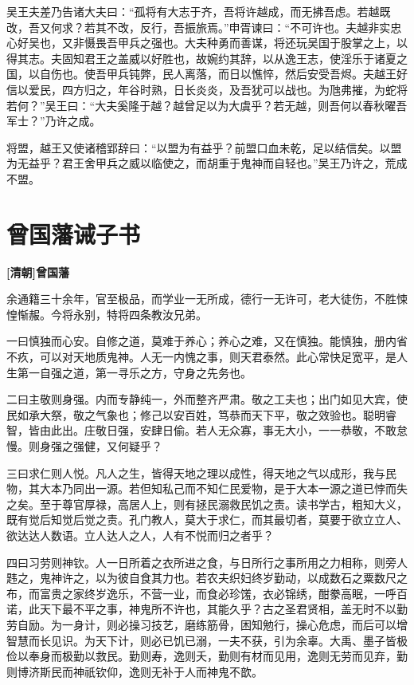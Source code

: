 \documentclass[UTF8,titlepage,oneside]{ctexbook}
\begin{document}
吴王夫差乃告诸大夫曰：“孤将有大志于齐，吾将许越成，而无拂吾虑。若越既改，吾又何求？若其不改，反行，吾振旅焉。”申胥谏曰：“不可许也。夫越非实忠心好吴也，又非慑畏吾甲兵之强也。大夫种勇而善谋，将还玩吴国于股掌之上，以得其志。夫固知君王之盖威以好胜也，故婉约其辞，以从逸王志，使淫乐于诸夏之国，以自伤也。使吾甲兵钝弊，民人离落，而日以憔悴，然后安受吾烬。夫越王好信以爱民，四方归之，年谷时熟，日长炎炎，及吾犹可以战也。为虺弗摧，为蛇将若何？”吴王曰：“大夫奚隆于越？越曾足以为大虞乎？若无越，则吾何以春秋曜吾军士？”乃许之成。


将盟，越王又使诸稽郢辞曰：“以盟为有益乎？前盟口血未乾，足以结信矣。以盟为无益乎？君王舍甲兵之威以临使之，而胡重于鬼神而自轻也。”吴王乃许之，荒成不盟。



\chapter*{曾国藩诫子书}
\begin{center}
	\textbf{[清朝]曾国藩}
\end{center}


余通籍三十余年，官至极品，而学业一无所成，德行一无许可，老大徒伤，不胜悚惶惭赧。今将永别，特将四条教汝兄弟。


一曰慎独而心安。自修之道，莫难于养心；养心之难，又在慎独。能慎独，册内省不疚，可以对天地质鬼神。人无一内愧之事，则天君泰然。此心常快足宽平，是人生第一自强之道，第一寻乐之方，守身之先务也。


二曰主敬则身强。内而专静纯一，外而整齐严肃。敬之工夫也；出门如见大宾，使民如承大祭，敬之气象也；修己以安百姓，笃恭而天下平，敬之效验也。聪明睿智，皆由此出。庄敬日强，安肆日偷。若人无众寡，事无大小，一一恭敬，不敢怠慢。则身强之强健，又何疑乎？


三曰求仁则人悦。凡人之生，皆得天地之理以成性，得天地之气以成形，我与民物，其大本乃同出一源。若但知私己而不知仁民爱物，是于大本一源之道已悖而失之矣。至于尊官厚禄，高居人上，则有拯民溺救民饥之责。读书学古，粗知大义，既有觉后知觉后觉之责。孔门教人，莫大于求仁，而其最切者，莫要于欲立立人、欲达达人数语。立人达人之人，人有不悦而归之者乎？


四曰习劳则神钦。人一日所着之衣所进之食，与日所行之事所用之力相称，则旁人韪之，鬼神许之，以为彼自食其力也。若农夫织妇终岁勤动，以成数石之粟数尺之布，而富贵之家终岁逸乐，不营一业，而食必珍馐，衣必锦绣，酣豢高眠，一呼百诺，此天下最不平之事，神鬼所不许也，其能久乎？古之圣君贤相，盖无时不以勤劳自励。为一身计，则必操习技艺，磨练筋骨，困知勉行，操心危虑，而后可以增智慧而长见识。为天下计，则必已饥已溺，一夫不获，引为余辜。大禹、墨子皆极俭以奉身而极勤以救民。勤则寿，逸则夭，勤则有材而见用，逸则无劳而见弃，勤则博济斯民而神祇钦仰，逸则无补于人而神鬼不歆。
\end{document}
